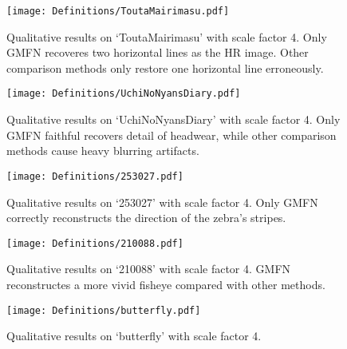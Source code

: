 \documentclass{bmvc2k}
\begin{document}
\begin{figure}[htbp]
	\centering
	{\texttt{[image: Definitions/ToutaMairimasu.pdf]}} 
	\caption{Qualitative results on `ToutaMairimasu' with scale factor 4. Only GMFN recoveres two horizontal lines as the HR image. Other comparison methods only restore one horizontal line erroneously.}
	\label{fig:ToutaMairimasu}
\end{figure}

\begin{figure}[htbp]
	\centering
	{\texttt{[image: Definitions/UchiNoNyansDiary.pdf]}} 
	\caption{Qualitative results on `UchiNoNyansDiary' with scale factor 4. Only GMFN faithful recovers detail of headwear, while other comparison methods cause heavy blurring artifacts.}
	\label{fig:UchiNoNyansDiary}
\end{figure}


\begin{figure}[htbp]
	\centering
	{\texttt{[image: Definitions/253027.pdf]}} 
	\caption{Qualitative results on `253027' with scale factor 4. Only GMFN correctly reconstructs the direction of the zebra's stripes.}
	\label{fig:253027}
\end{figure}

\begin{figure}[htbp]
	\centering
	{\texttt{[image: Definitions/210088.pdf]}} 
	\caption{Qualitative results on `210088' with scale factor 4. GMFN reconstructes a more vivid fisheye compared with other methods.}
	\label{fig:210088}
\end{figure}


\begin{figure}[htbp]
	\centering
	{\texttt{[image: Definitions/butterfly.pdf]}} 
	\caption{Qualitative results on `butterfly' with scale factor 4.}
	\label{fig:butterfly}
\end{figure}

 	
\end{document}
